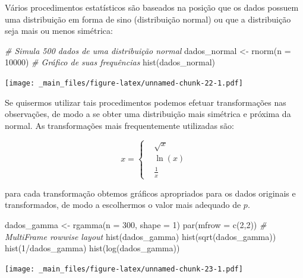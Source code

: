 \documentclass[
]{book}
\newenvironment{Shaded}{\begin{snugshade}}{\end{snugshade}}
\newcommand{\AttributeTok}[1]{\textcolor[rgb]{0.77,0.63,0.00}{#1}}
\newcommand{\CommentTok}[1]{\textcolor[rgb]{0.56,0.35,0.01}{\textit{#1}}}
\newcommand{\DecValTok}[1]{\textcolor[rgb]{0.00,0.00,0.81}{#1}}
\newcommand{\FunctionTok}[1]{\textcolor[rgb]{0.00,0.00,0.00}{#1}}
\newcommand{\NormalTok}[1]{#1}
\newcommand{\OtherTok}[1]{\textcolor[rgb]{0.56,0.35,0.01}{#1}}
\newcommand{\SpecialCharTok}[1]{\textcolor[rgb]{0.00,0.00,0.00}{#1}}
\begin{document}
Vários procedimentos estatísticos são baseados na posição que os dados possuem uma distribuição em forma de sino (distribuição normal) ou que a distribuição seja mais ou menos simétrica:

\begin{Shaded}
\begin{Highlighting}[]
\CommentTok{\# Simula 500 dados de uma distribuição normal}
\NormalTok{dados\_normal }\OtherTok{\textless{}{-}} \FunctionTok{rnorm}\NormalTok{(}\AttributeTok{n =} \DecValTok{10000}\NormalTok{)}
\CommentTok{\# Gráfico de suas frequências}
\FunctionTok{hist}\NormalTok{(dados\_normal)}
\end{Highlighting}
\end{Shaded}

\texttt{[image: \_main\_files/figure-latex/unnamed-chunk-22-1.pdf]}

Se quisermos utilizar tais procedimentos podemos efetuar transformações nas observações, de modo a se obter uma distribuição mais simétrica e próxima da normal. As transformações mais frequentemente utilizadas são:

\[
x = \left\{\begin{matrix}&\sqrt{x}\\ &\ln(x) \\&\frac{1}{x}\end{matrix}\right.
\]

para cada transformação obtemos gráficos apropriados para os dados originais e transformados, de modo a escolhermos o valor mais adequado de \(p\).

\begin{Shaded}
\begin{Highlighting}[]
\NormalTok{dados\_gamma }\OtherTok{\textless{}{-}} \FunctionTok{rgamma}\NormalTok{(}\AttributeTok{n =} \DecValTok{300}\NormalTok{, }\AttributeTok{shape =} \DecValTok{1}\NormalTok{)}
\FunctionTok{par}\NormalTok{(}\AttributeTok{mfrow =} \FunctionTok{c}\NormalTok{(}\DecValTok{2}\NormalTok{,}\DecValTok{2}\NormalTok{)) }\CommentTok{\# MultiFrame rowwise layout}
\FunctionTok{hist}\NormalTok{(dados\_gamma)}
\FunctionTok{hist}\NormalTok{(}\FunctionTok{sqrt}\NormalTok{(dados\_gamma))}
\FunctionTok{hist}\NormalTok{(}\DecValTok{1}\SpecialCharTok{/}\NormalTok{dados\_gamma)}
\FunctionTok{hist}\NormalTok{(}\FunctionTok{log}\NormalTok{(dados\_gamma))}
\end{Highlighting}
\end{Shaded}

\texttt{[image: \_main\_files/figure-latex/unnamed-chunk-23-1.pdf]}
\end{document}
